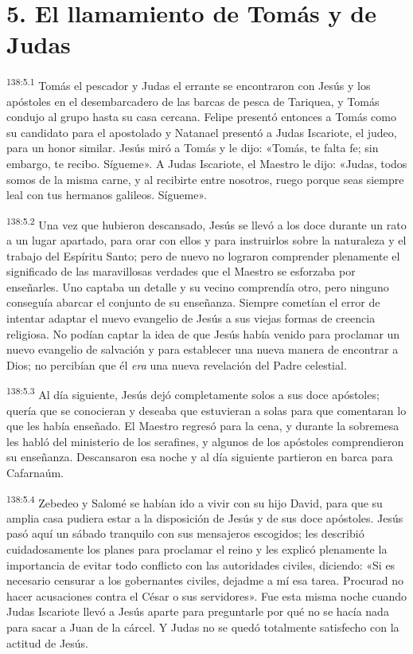 \section*{5. El llamamiento de Tomás y de Judas}
\par 
\textsuperscript{138:5.1} Tomás el pescador y Judas el errante se encontraron con Jesús y los apóstoles en el desembarcadero de las barcas de pesca de Tariquea, y Tomás condujo al grupo hasta su casa cercana. Felipe presentó entonces a Tomás como su candidato para el apostolado y Natanael presentó a Judas Iscariote, el judeo, para un honor similar. Jesús miró a Tomás y le dijo: «Tomás, te falta fe; sin embargo, te recibo. Sígueme». A Judas Iscariote, el Maestro le dijo: «Judas, todos somos de la misma carne, y al recibirte entre nosotros, ruego porque seas siempre leal con tus hermanos galileos. Sígueme».

\par 
\textsuperscript{138:5.2} Una vez que hubieron descansado, Jesús se llevó a los doce durante un rato a un lugar apartado, para orar con ellos y para instruirlos sobre la naturaleza y el trabajo del Espíritu Santo; pero de nuevo no lograron comprender plenamente el significado de las maravillosas verdades que el Maestro se esforzaba por enseñarles. Uno captaba un detalle y su vecino comprendía otro, pero ninguno conseguía abarcar el conjunto de su enseñanza. Siempre cometían el error de intentar adaptar el nuevo evangelio de Jesús a sus viejas formas de creencia religiosa. No podían captar la idea de que Jesús había venido para proclamar un nuevo evangelio de salvación y para establecer una nueva manera de encontrar a Dios; no percibían que él \textit{era} una nueva revelación del Padre celestial.

\par 
\textsuperscript{138:5.3} Al día siguiente, Jesús dejó completamente solos a sus doce apóstoles; quería que se conocieran y deseaba que estuvieran a solas para que comentaran lo que les había enseñado. El Maestro regresó para la cena, y durante la sobremesa les habló del ministerio de los serafines, y algunos de los apóstoles comprendieron su enseñanza. Descansaron esa noche y al día siguiente partieron en barca para Cafarnaúm.

\par 
\textsuperscript{138:5.4} Zebedeo y Salomé se habían ido a vivir con su hijo David, para que su amplia casa pudiera estar a la disposición de Jesús y de sus doce apóstoles. Jesús pasó aquí un sábado tranquilo con sus mensajeros escogidos; les describió cuidadosamente los planes para proclamar el reino y les explicó plenamente la importancia de evitar todo conflicto con las autoridades civiles, diciendo: «Si es necesario censurar a los gobernantes civiles, dejadme a mí esa tarea. Procurad no hacer acusaciones contra el César o sus servidores». Fue esta misma noche cuando Judas Iscariote llevó a Jesús aparte para preguntarle por qué no se hacía nada para sacar a Juan de la cárcel. Y Judas no se quedó totalmente satisfecho con la actitud de Jesús.

